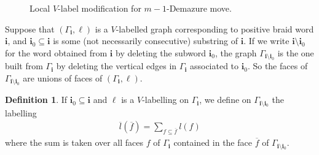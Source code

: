 \documentclass[11pt, reqno]{amsart}
\theoremstyle{definition}
\newtheorem{defn}[theorem]{Definition}
\numberwithin{equation}{section}
\def\pt{\mathrm{pt}}
\newcommand{\mbi}{\mathbf{i}}
\begin{document}
\begin{figure}
\caption{Local $V$-label modification for $m-1$-Demazure move. }
\label{fig:mut-dem2}
\end{figure}



Suppose that $(\Gamma_{\mathbf{i}},\ell)$ is a $V$-labelled graph corresponding to positive braid word $\mathbf{i}$, and $\mathbf{i}_0\subseteq\mathbf{i}$ is some (not necessarily consecutive) substring of $\mathbf{i}$. If we write $\mathbf{i}\setminus\mathbf{i}_0$ for the word obtained from  $\mathbf{i}$ by deleting the subword $\mathbf{i}_0$, the graph $\Gamma_{\mathbf{i}\setminus\mathbf{i}_0}$ is the one built from $\Gamma_{\mathbf{i}}$ by deleting the vertical edges in $\Gamma_{\mathbf{i}}$ associated to $\mathbf{i}_0$. So the faces of $\Gamma_{\mathbf{i}\setminus\mathbf{i}_0}$  are unions of faces of $(\Gamma_{\mathbf{i}},\ell)$.

\begin{defn} 
If $\mbi_0 \subseteq \mbi$ and $\ell$ is a $V$-labelling on $\Gamma_{\mbi}$, we define on $\Gamma_{\mbi \setminus \mbi_0}$ the labelling  
\begin{align}
\label{eq:face-merge}
\overline{l}(\overline{f}) =\sum_{f\subseteq \overline{f}}l(f)
\end{align}
 where the sum is taken over all faces $f$ of $\Gamma_{\mathbf{i}}$ contained in the face $\overline{f}$ of $\Gamma_{\mathbf{i}\setminus\mathbf{i}_0}$. 
\end{defn}
\end{document}
